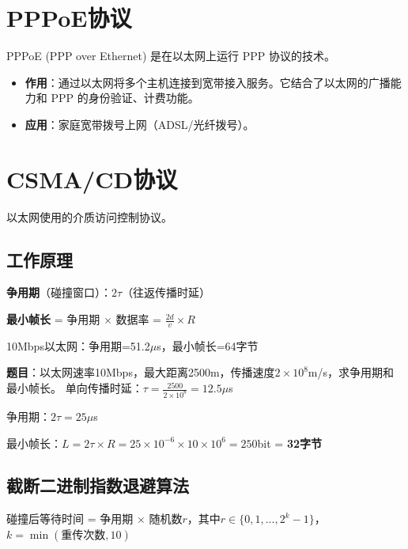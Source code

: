 \section{PPPoE协议}
PPPoE (PPP over Ethernet) 是在以太网上运行 PPP 协议的技术。
\begin{itemize}[leftmargin=2em,itemsep=0pt]
    \item \textbf{作用}：通过以太网将多个主机连接到宽带接入服务。它结合了以太网的广播能力和 PPP 的身份验证、计费功能。
    \item \textbf{应用}：家庭宽带拨号上网（ADSL/光纤拨号）。
\end{itemize}

\section{CSMA/CD协议}
以太网使用的介质访问控制协议。

\subsection{工作原理}
\begin{center}
\end{center}

\begin{formulabox}
\textbf{争用期}（碰撞窗口）：$2\tau$（往返传播时延）

\textbf{最小帧长} = 争用期 $\times$ 数据率 = $\frac{2d}{v} \times R$

10Mbps以太网：争用期=51.2$\mu$s，最小帧长=64字节
\end{formulabox}

\begin{examplebox}
\textbf{题目}：以太网速率10Mbps，最大距离2500m，传播速度$2\times10^8$m/s，求争用期和最小帧长。
\tcblower
单向传播时延：$\tau = \frac{2500}{2\times10^8} = 12.5\mu$s

争用期：$2\tau = 25\mu$s

最小帧长：$L = 2\tau \times R = 25\times10^{-6} \times 10\times10^6 = 250$bit = \textbf{32字节}
\end{examplebox}

\subsection{截断二进制指数退避算法}
碰撞后等待时间 = 争用期 $\times$ 随机数$r$，其中$r \in \{0,1,...,2^k-1\}$，$k=\min(\text{重传次数},10)$

